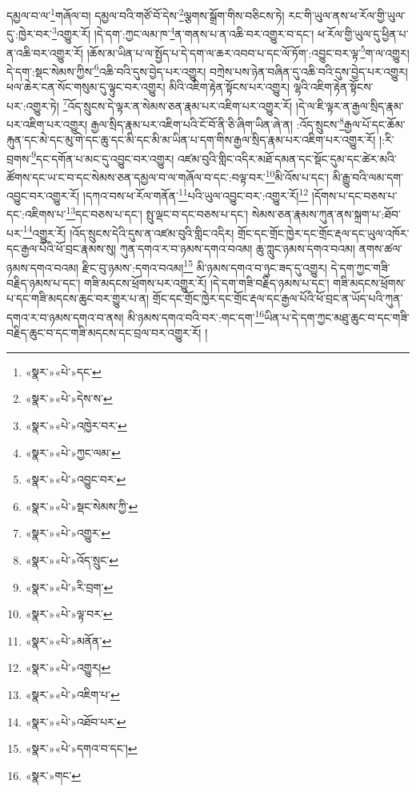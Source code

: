 དམྱལ་བ་ལ་\footnote{«སྣར་»«པེ་»དང་}གཞོལ་བ། དམྱལ་བའི་གཙོ་བོ་དེས་\footnote{«སྣར་»«པེ་»དེས་ས་}ལྕགས་སྒྲོག་གིས་བཅིངས་ཏེ། རང་གི་ཡུལ་ནས་ཕ་རོལ་གྱི་ཡུལ་དུ་:ཁྱེར་བར་\footnote{«སྣར་»«པེ་»འཁྱེར་བར་}འགྱུར་རོ། །དེ་དག་:ཀྱང་ལམ་ཁ་\footnote{«སྣར་»«པེ་»ཀྱང་ལམ་}ན་གནས་པ་ན་འཆི་བར་འགྱུར་བ་དང་། ཕ་རོལ་གྱི་ཡུལ་དུ་ཕྱིན་པ་ན་འཆི་བར་འགྱུར་རོ། །ཆོས་མ་ཡིན་པ་ལ་སྤྱོད་པ་དེ་དག་ལ་ཆར་འབབ་པ་དང་ལོ་ཏོག་:འབྱུང་བར་ལྟ་\footnote{«སྣར་»«པེ་»འབྱུང་བར་}ག་ལ་འགྱུར། དེ་དག་:སྡང་སེམས་ཀྱིས་\footnote{«སྣར་»«པེ་»སྡང་སེམས་ཀྱི་}འཆི་བའི་དུས་བྱེད་པར་འགྱུར། བཀྲེས་པས་ཉེན་བཞིན་དུ་འཆི་བའི་དུས་བྱེད་པར་འགྱུར། ཕལ་ཆེར་ངན་སོང་གསུམ་དུ་ལྟུང་བར་འགྱུར། མིའི་འཇིག་རྟེན་སྟོངས་པར་འགྱུར། ལྷའི་འཇིག་རྟེན་སྟོངས་པར་:འགྱུར་ཏེ། \footnote{«སྣར་»«པེ་»འགྱུར་}འོད་སྲུངས་དེ་ལྟར་ན་སེམས་ཅན་རྣམ་པར་འཇིག་པར་འགྱུར་རོ། །དེ་ལ་ཇི་ལྟར་ན་རྒྱལ་སྲིད་རྣམ་པར་འཇིག་པར་འགྱུར། རྒྱལ་སྲིད་རྣམ་པར་འཇིག་པའི་ངོ་བོ་ནི་ཅི་ཞིག་ཡིན་ཞེ་ན། :འོད་སྲུངས་\footnote{«སྣར་»«པེ་»འོད་སྲུང་}རྒྱལ་པོ་དང་ཆོམ་རྐུན་དང་མེ་དང་མུ་གེ་དང་ཆུ་དང་མི་དང་མི་མ་ཡིན་པ་དག་གིས་རྒྱལ་སྲིད་རྣམ་པར་འཇིག་པར་འགྱུར་རོ། །:རི་བྲགས་\footnote{«སྣར་»«པེ་»རི་བྲག་}དང་དགོན་པ་མང་དུ་འབྱུང་བར་འགྱུར། འཛམ་བུའི་གླིང་འདིར་མཐོ་དམན་དང་སྡོང་དུམ་དང་ཚེར་མའི་ཚོགས་དང་ཡ་ང་བ་དང་སེམས་ཅན་དམྱལ་བ་ལ་གཞོལ་བ་དང་:བལྟ་བར་\footnote{«སྣར་»«པེ་»ལྟ་བར་}མི་འོས་པ་དང་། མི་རྒྱུ་བའི་ལམ་དག་འབྱུང་བར་འགྱུར་རོ། །དཀའ་བས་ཕ་རོལ་གནོན་\footnote{«སྣར་»«པེ་»མནོན་}པའི་ཡུལ་འབྱུང་བར་:འགྱུར་རོ།\footnote{«སྣར་»«པེ་»འགྱུར།} །དོགས་པ་དང་བཅས་པ་དང་:འཇིགས་པ་\footnote{«སྣར་»«པེ་»འཇིག་པ་}དང་བཅས་པ་དང་། སྤུ་ལྡང་བ་དང་བཅས་པ་དང་། སེམས་ཅན་རྣམས་ཀུན་ནས་སྐྲག་པ་:ཐོབ་པར་\footnote{«སྣར་»«པེ་»འཐོབ་པར་}འགྱུར་རོ། །འོད་སྲུངས་དེའི་དུས་ན་འཛམ་བུའི་གླིང་འདིར། གྲོང་དང་གྲོང་ཁྱེར་དང་གྲོང་རྡལ་དང་ཡུལ་འཁོར་དང་རྒྱལ་པོའི་ཕོ་བྲང་རྣམས་སུ། ཀུན་དགའ་ར་བ་ཉམས་དགའ་བའམ། ཆུ་ཀླུང་ཉམས་དགའ་བའམ། ནགས་ཚལ་ཉམས་དགའ་བའམ། རྫིང་བུ་ཉམས་:དགའ་བའམ།\footnote{«སྣར་»«པེ་»དགའ་བ་དང་།} མི་ཉམས་དགའ་བ་ཉུང་ཟད་དུ་འགྱུར། དེ་དག་ཀྱང་གཟི་བརྗིད་ཉམས་པ་དང་། གཟི་མདངས་ཕྲོགས་པར་འགྱུར་རོ། །དེ་དག་གཟི་བརྗིད་ཉམས་པ་དང་། གཟི་མདངས་ཕྲོགས་པ་དང་གཟི་མདངས་ཆུང་བར་གྱུར་པ་ན། གྲོང་དང་གྲོང་ཁྱེར་དང་གྲོང་རྡལ་དང་རྒྱལ་པོའི་ཕོ་བྲང་ན་ཡོད་པའི་ཀུན་དགའ་ར་བ་ཉམས་དགའ་བ་ནས། མི་ཉམས་དགའ་བའི་བར་:གང་དག་\footnote{«སྣར་»གང་}ཡིན་པ་དེ་དག་ཀྱང་མཐུ་ཆུང་བ་དང་གཟི་བརྗིད་ཆུང་བ་དང་གཟི་མདངས་དང་བྲལ་བར་འགྱུར་རོ། །
